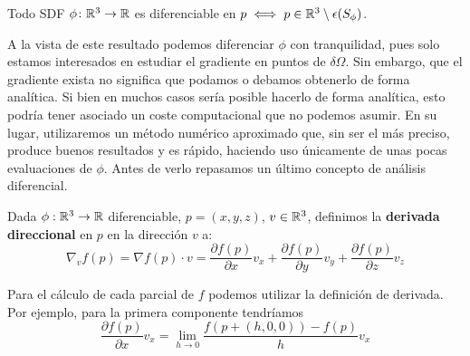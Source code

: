 \begin{corolario}
    Todo SDF $\phi\colon \mathbb{R}^3\to \mathbb{R}$ es diferenciable en $p \iff p\in \mathbb{R}^3\setminus \epsilon(S_{\phi})$. 
\end{corolario}

A la vista de este resultado podemos diferenciar $\phi$ con tranquilidad, pues solo estamos interesados en estudiar el gradiente en puntos de $\delta\Omega$. Sin embargo, que el gradiente exista no significa que podamos o debamos obtenerlo de forma analítica. Si bien en muchos casos sería posible hacerlo de forma analítica, esto podría tener asociado un coste computacional que no podemos asumir. En su lugar, utilizaremos un método numérico aproximado que, sin ser el más preciso, produce buenos resultados y es rápido, haciendo uso únicamente de unas pocas evaluaciones de $\phi$. Antes de verlo repasamos un último concepto de análisis diferencial.


\begin{definicion}
  Dada $\phi:\mathbb{R}^3\to \mathbb{R}$ diferenciable, $p = (x,y,z)$, $v\in \mathbb{R}^3$, definimos la \textbf{derivada direccional} en $p$ en la dirección $v$ a:
  \begin{equation*}
    \nabla_v f(p) = \nabla f(p) \cdot v = \frac{\partial{f}(p)}{\partial{x}}v_x + \frac{\partial{f}(p)}{\partial{y}}v_y + \frac{\partial{f}(p)}{\partial{z}}v_z
  \end{equation*}
\end{definicion}

Para el cálculo de cada parcial de $f$ podemos utilizar la definición de derivada. Por ejemplo, para la primera componente tendríamos
\begin{equation*}
  \frac{\partial{f}(p)}{\partial{x}} v_x = \lim_{h\to 0}\frac{f(p + (h,0,0)) - f(p)}{h} v_x
\end{equation*}

